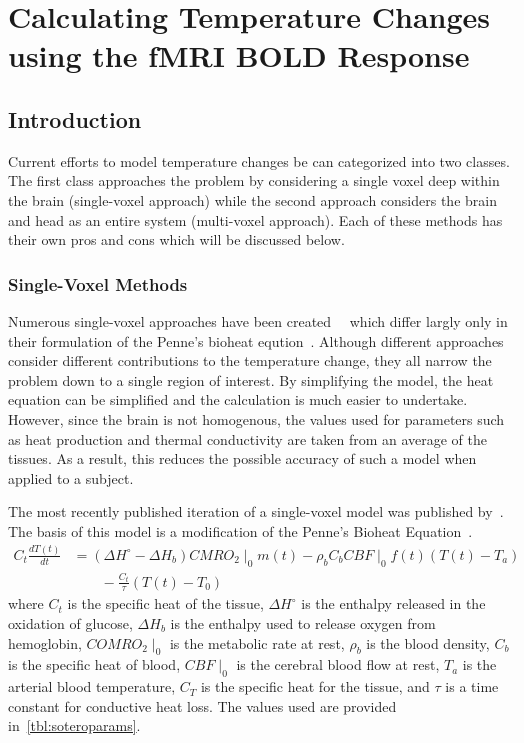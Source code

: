 \chapter{Calculating Temperature Changes using the fMRI BOLD Response}
  \section{\label{sec:tempmodelintro} Introduction}
  Current efforts to model temperature changes be can categorized into two classes.  The first class approaches the problem by considering a single voxel deep within the brain (single-voxel approach) while the second approach considers the brain and head as an entire system (multi-voxel approach).  Each of these methods has their own pros and cons which will be discussed below.
    \subsection{\label{sec:singlevox} Single-Voxel Methods}
    Numerous single-voxel approaches have been created ~\citep{sotero2011,yablonskiy,trubel}~which differ largly only in their formulation of the Penne's bioheat eqution~\citep{pennes}.  Although different approaches consider different contributions to the temperature change, they all narrow the problem down to a single region of interest.  By simplifying the model, the heat equation can be simplified and the calculation is much easier to undertake.  However, since the brain is not homogenous, the values used for parameters such as heat production and thermal conductivity are taken from an average of the tissues.  As a result, this reduces the possible accuracy of such a model when applied to a subject.
    
    The most recently published iteration of a single-voxel model was published by~\citet{sotero2011}.  The basis of this model is a modification of the Penne's Bioheat Equation~\citep{pennes, sotero2011}.
    \begin{align}
      \label{eq:bioheat}
      C_t \frac{dT(t)}{dt} &= (\Delta H^{\circ}-\Delta H_{b}) CMRO_{2}\mid_{0} m(t) - \rho_{b} C_{b} CBF\mid_{0} f(t) (T(t) - T_{a}) \nonumber \\
      &\qquad {} - \frac{C_{t}}{\tau} (T(t)-T_{0})
    \end{align}
    where $C_t$ is the specific heat of the tissue, $\Delta H^{\circ}$ is the enthalpy released in the oxidation of glucose, $\Delta H_b$ is the enthalpy used to release oxygen from hemoglobin, $COMRO_2 \mid_0$ is the metabolic rate at rest, $\rho_b$ is the blood density, $C_b$ is the specific heat of blood, $CBF\mid_0$ is the cerebral blood flow at rest, $T_a$ is the arterial blood temperature, $C_T$ is the specific heat for the tissue, and $\tau$ is a time constant for conductive heat loss.  The values used are provided in~\cref{tbl:soteroparams}.
    
